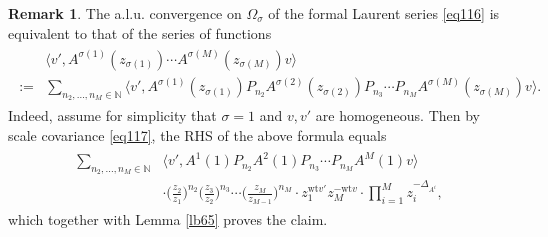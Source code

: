 \documentclass[11pt,b5paper,notitlepage]{article}
\theoremstyle{definition}
\newtheorem{rem}[df]{Remark}
\theoremstyle{plain}
\newcommand{\bigbk}[1]{\big\langle {#1}\big\rangle}
\newcommand{\Nbb}{\mathbb N}
\newcommand{\wt}{\mathrm{wt}}
\numberwithin{equation}{section}
\begin{document}
\begin{rem}
The a.l.u. convergence on $\Omega_\sigma$ of the formal Laurent series \eqref{eq116} is equivalent to that  of the series of functions
\begin{align}
\begin{aligned}
&\bigbk{v',A^{\sigma(1)}(z_{\sigma(1)})\cdots A^{\sigma(M)}(z_{\sigma(M)})v}	\\
:=&\sum_{n_2,\dots,n_M\in\Nbb}\bigbk{v',A^{\sigma(1)}(z_{\sigma(1)})P_{n_2}A^{\sigma(2)}(z_{\sigma(2)})P_{n_3}\cdots P_{n_M}A^{\sigma(M)}(z_{\sigma(M)})v}.
\end{aligned}	
\end{align}
Indeed, assume for simplicity that $\sigma=1$ and $v,v'$ are homogeneous. Then by scale covariance \eqref{eq117}, the RHS of the above formula equals
\begin{align}\label{eq99}
\begin{aligned}
\sum_{n_2,\dots,n_M\in\Nbb}&\bigbk{v',A^1(1)P_{n_2}A^2(1)P_{n_3}\cdots P_{n_M}A^M(1)v}\\
&\cdot \Big(\frac {z_2}{z_1}\Big)^{n_2}\Big(\frac {z_3}{z_2}\Big)^{n_3}\cdots \Big(\frac {z_M}{z_{M-1}}\Big)^{n_M}\cdot z_1^{\wt v'}z_M^{-\wt v}\cdot \prod_{i=1}^Mz_i^{-\Delta_{A^i}},
\end{aligned}	
\end{align}
which together with Lemma \ref{lb65} proves the claim.
\end{rem}


\subsection{}
\end{document}
